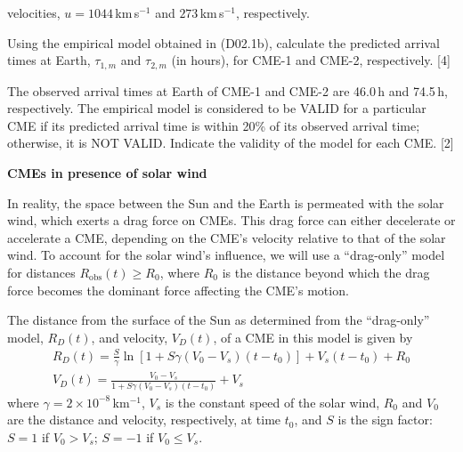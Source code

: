 \begin{description}
  velocities, $u = 1044$\,km\,s$^{-1}$ and $273$\,km\,s$^{-1}$, respectively.
\item[(D02.2a)] Using the empirical model obtained in (D02.1b), calculate the
  predicted arrival times at Earth, $\tau_{1,m}$ and $\tau_{2,m}$ (in hours),
  for CME-1 and CME-2, respectively. \hfill[4]
\item[(D02.2b)] The observed arrival times at Earth of CME-1 and CME-2 are
  46.0\,h and 74.5\,h, respectively. The empirical model is considered to be
  VALID for a particular CME if its predicted arrival time is within 20\% of
  its observed arrival time; otherwise, it is NOT VALID. Indicate the validity
  of the model for each CME. \hfill[2]
\end{description}

\medskip\noindent\textbf{CMEs in presence of solar wind}

In reality, the space between the Sun and the Earth is permeated with the
solar wind, which exerts a drag force on CMEs. This drag force can either
decelerate or accelerate a CME, depending on the CME's velocity relative to
that of the solar wind. To account for the solar wind's influence, we will use
a ``drag-only'' model for distances $R_{\mathrm{obs}}(t) \geq R_0$, where
$R_0$ is the distance beyond which the drag force becomes the dominant force
affecting the CME's motion.

The distance from the surface of the Sun as determined from the ``drag-only''
model, $R_D(t)$, and velocity, $V_D(t)$, of a CME in this model is given by
\begin{gather*}
R_D(t) = \frac{S}{\gamma}\ln\left[1 + S\gamma(V_0-V_s)(t-t_0)\right]
  + V_s(t-t_0) + R_0\\
V_D(t) = \frac{V_0 - V_s}{1 + S\gamma(V_0-V_s)(t-t_0)} + V_s
\end{gather*}
where $\gamma = 2\times10^{-8}$\,km$^{-1}$, $V_s$ is the constant speed of the
solar wind, $R_0$ and $V_0$ are the distance and velocity, respectively, at
time $t_0$, and $S$ is the sign factor: $S = 1$ if $V_0 > V_s$; $S = -1$ if
$V_0 \leq V_s$.

